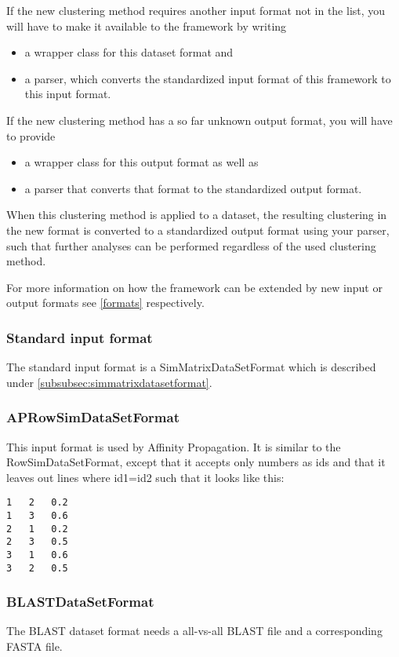 	If the new clustering method requires another input format not in the list, you will have to make it available to the framework by writing
	\begin{itemize}
		\item a wrapper class for this dataset format and 
		\item a parser, which converts the standardized input format of this framework to this input format.
	\end{itemize}
	If the new clustering method has a so far unknown output format, you will have to provide
	\begin{itemize}
		\item a wrapper class for this output format as well as
		\item a parser that converts that format to the standardized output format.
	\end{itemize}
	When this clustering method is applied to a dataset, the resulting clustering in the new format is converted to a standardized output format using your parser, such that further analyses can be performed regardless of the used clustering method.

For more information on how the framework can be extended by new input or output formats see \ref{formats} respectively.


	
			\subsubsection{Standard input format} \label{subsubsec:standarddatasetformat}
			The standard input format is a SimMatrixDataSetFormat which is described under \ref{subsubsec:simmatrixdatasetformat}.
			\subsubsection{APRowSimDataSetFormat}\label{aprowsimdatasetformat}
				This input format is used by Affinity Propagation. It is similar to the RowSimDataSetFormat, except that it accepts only numbers as ids and that it leaves out lines where id1=id2 such that it looks like this:
				\begin{lstlisting}
1	2	0.2
1	3	0.6
2	1	0.2
2	3	0.5
3	1	0.6
3	2	0.5				\end{lstlisting}
			\subsubsection{BLASTDataSetFormat}
				The BLAST dataset format needs a all-vs-all BLAST file and a corresponding FASTA file.
				

